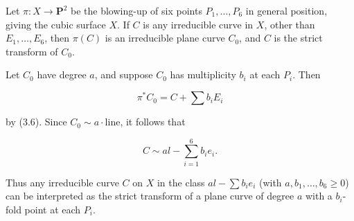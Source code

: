 Let $\pi: X \to \mathbf{P}^2$ be the blowing-up of six points $P_1, \ldots, P_6$ in general position, giving the cubic surface $X$. If $C$ is any irreducible curve in $X$, other than $E_1, \ldots, E_6$, then $\pi(C)$ is an irreducible plane curve $C_0$, and $C$ is the strict transform of $C_0$.

Let $C_0$ have degree $a$, and suppose $C_0$ has multiplicity $b_i$ at each $P_i$. Then

$$\pi^* C_0 = C + \sum b_i E_i$$

by (3.6). Since $C_0 \sim a \cdot \text{line}$, it follows that

$$C \sim al - \sum_{i=1}^6 b_i e_i.$$

Thus any irreducible curve $C$ on $X$ in the class $al - \sum b_i e_i$ (with $a, b_1, \ldots, b_6 \geqslant 0$) can be interpreted as the strict transform of a plane curve of degree $a$ with a $b_i$-fold point at each $P_i$.
